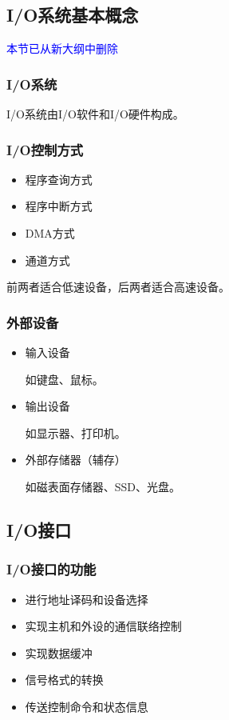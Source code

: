 \documentclass[12pt, a4paper, oneside]{ctexart}
\begin{document}
\subsection{I/O系统基本概念}

\textcolor{blue}{本节已从新大纲中删除}

\subsubsection{I/O系统}

I/O系统由I/O软件和I/O硬件构成。

\subsubsection{I/O控制方式}

\begin{itemize}
  \item 程序查询方式
  \item 程序中断方式
  \item DMA方式
  \item 通道方式
\end{itemize}

前两者适合低速设备，后两者适合高速设备。

\subsubsection{外部设备}

\begin{itemize}
  \item 输入设备
  
  如键盘、鼠标。

  \item 输出设备
  
  如显示器、打印机。

  \item 外部存储器（辅存）

  如磁表面存储器、SSD、光盘。
\end{itemize}

\subsection{I/O接口}

\subsubsection{I/O接口的功能}

\begin{itemize}
  \item 进行地址译码和设备选择
  \item 实现主机和外设的通信联络控制
  \item 实现数据缓冲
  \item 信号格式的转换
  \item 传送控制命令和状态信息
\end{itemize}
\end{document}
